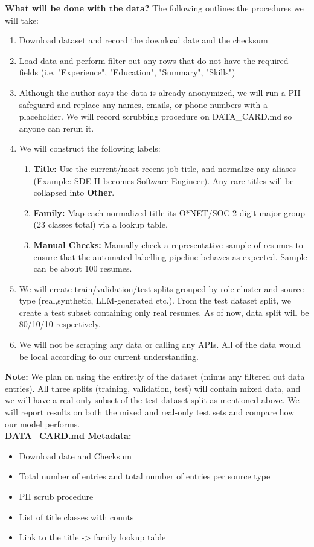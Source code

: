 \documentclass[12pt]{article}
\begin{document}
\noindent \textbf{What will be done with the data?}
The following outlines the procedures we will take:
\begin{enumerate}
  \item Download dataset and record the download date and the checksum
  \item Load data and perform filter out any rows that do not have the required fields (i.e. "Experience", "Education", "Summary", "Skills")
  \item Although the author says the data is already anonymized, we will run a PII safeguard and replace any names, emails, or phone numbers with a placeholder. We will record scrubbing procedure on DATA\_CARD.md so anyone can rerun it.
  \item We will construct the following labels:
  \begin{enumerate}
    \item \textbf{Title:} Use the current/most recent job title, and normalize any aliases (Example: SDE II becomes Software Engineer). Any rare titles will be collapsed into \textbf{Other}.
    \item \textbf{Family:} Map each normalized title its O*NET/SOC 2-digit major group (23 classes total) via a lookup table.
    \item \textbf{Manual Checks:} Manually check a representative sample of resumes to ensure that the automated labelling pipeline behaves as expected. Sample can be about 100 resumes.
  \end{enumerate}
  \item We will create train/validation/test splits grouped by role cluster and source type (real,synthetic, LLM-generated etc.). From the test dataset split, we create a test subset containing only real resumes. As of now,
  data split will be 80/10/10 respectively.
  \item We will not be scraping any data or calling any APIs. All of the data would be local according to our current understanding.
\end{enumerate}

\textbf{Note:} We plan on using the entiretly of the dataset (minus any filtered out data entries). All three splits (training, validation, test) will contain mixed data, and we will have a real-only
subset of the test dataset split as mentioned above. We will report results on both the mixed and real-only test sets and compare how our model performs.\\
\textbf{DATA\_CARD.md Metadata:}
\begin{itemize}
  \item Download date and Checksum
  \item Total number of entries and total number of entries per source type
  \item PII scrub procedure
  \item List of title classes with counts
  \item Link to the title -> family lookup table
\end{itemize}
\end{document}

